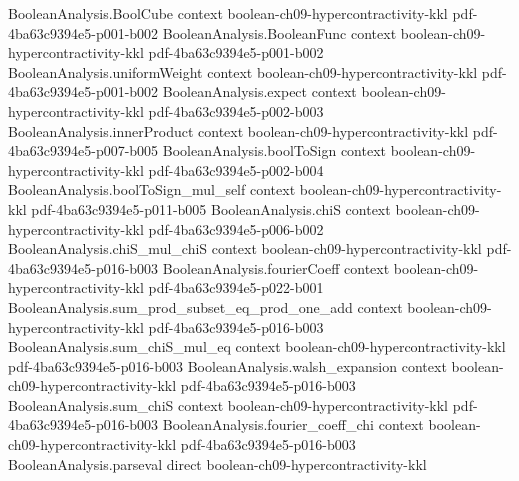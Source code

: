 \begin{theorem}
\label{BooleanAnalysis.Hypercontractivity.weak_two_function_hypercontractivity_one_bit}
\leanok
{}
\proofstep
  {BooleanAnalysis.BoolCube}
  {context}
  {boolean-ch09-hypercontractivity-kkl}
  {pdf-4ba63c9394e5-p001-b002}
\proofstep
  {BooleanAnalysis.BooleanFunc}
  {context}
  {boolean-ch09-hypercontractivity-kkl}
  {pdf-4ba63c9394e5-p001-b002}
\proofstep
  {BooleanAnalysis.uniformWeight}
  {context}
  {boolean-ch09-hypercontractivity-kkl}
  {pdf-4ba63c9394e5-p001-b002}
\proofstep
  {BooleanAnalysis.expect}
  {context}
  {boolean-ch09-hypercontractivity-kkl}
  {pdf-4ba63c9394e5-p002-b003}
\proofstep
  {BooleanAnalysis.innerProduct}
  {context}
  {boolean-ch09-hypercontractivity-kkl}
  {pdf-4ba63c9394e5-p007-b005}
\proofstep
  {BooleanAnalysis.boolToSign}
  {context}
  {boolean-ch09-hypercontractivity-kkl}
  {pdf-4ba63c9394e5-p002-b004}
\proofstep
  {BooleanAnalysis.boolToSign_mul_self}
  {context}
  {boolean-ch09-hypercontractivity-kkl}
  {pdf-4ba63c9394e5-p011-b005}
\proofstep
  {BooleanAnalysis.chiS}
  {context}
  {boolean-ch09-hypercontractivity-kkl}
  {pdf-4ba63c9394e5-p006-b002}
\proofstep
  {BooleanAnalysis.chiS_mul_chiS}
  {context}
  {boolean-ch09-hypercontractivity-kkl}
  {pdf-4ba63c9394e5-p016-b003}
\proofstep
  {BooleanAnalysis.fourierCoeff}
  {context}
  {boolean-ch09-hypercontractivity-kkl}
  {pdf-4ba63c9394e5-p022-b001}
\proofstep
  {BooleanAnalysis.sum_prod_subset_eq_prod_one_add}
  {context}
  {boolean-ch09-hypercontractivity-kkl}
  {pdf-4ba63c9394e5-p016-b003}
\proofstep
  {BooleanAnalysis.sum_chiS_mul_eq}
  {context}
  {boolean-ch09-hypercontractivity-kkl}
  {pdf-4ba63c9394e5-p016-b003}
\proofstep
  {BooleanAnalysis.walsh_expansion}
  {context}
  {boolean-ch09-hypercontractivity-kkl}
  {pdf-4ba63c9394e5-p016-b003}
\proofstep
  {BooleanAnalysis.sum_chiS}
  {context}
  {boolean-ch09-hypercontractivity-kkl}
  {pdf-4ba63c9394e5-p016-b003}
\proofstep
  {BooleanAnalysis.fourier_coeff_chi}
  {context}
  {boolean-ch09-hypercontractivity-kkl}
  {pdf-4ba63c9394e5-p016-b003}
\proofstep
  {BooleanAnalysis.parseval}
  {direct}
  {boolean-ch09-hypercontractivity-kkl}

\end{theorem}
